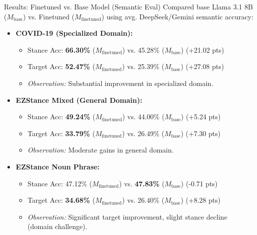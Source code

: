 \documentclass{beamer}
\begin{document}
\begin{frame}{Results: Finetuned vs. Base Model (Semantic Eval)}
  \footnotesize %
  Compared base Llama 3.1 8B ($M_{\text{base}}$) vs. Finetuned ($M_{\text{finetuned}}$) using avg. DeepSeek/Gemini semantic accuracy:

  \medskip
  \begin{itemize}
    \item \textbf{COVID-19 (Specialized Domain):}
          \begin{itemize}
            \item Stance Acc: \textbf{66.30\%} ($M_{\text{finetuned}}$) vs. 45.28\% ($M_{\text{base}}$) \quad (+21.02 pts)
            \item Target Acc: \textbf{52.47\%} ($M_{\text{finetuned}}$) vs. 25.39\% ($M_{\text{base}}$) \quad (+27.08 pts)
            \item \textit{Observation:} Substantial improvement in specialized domain.
          \end{itemize}
    \medskip
    \item \textbf{EZStance Mixed (General Domain):}
          \begin{itemize}
            \item Stance Acc: \textbf{49.24\%} ($M_{\text{finetuned}}$) vs. 44.00\% ($M_{\text{base}}$) \quad (+5.24 pts)
            \item Target Acc: \textbf{33.79\%} ($M_{\text{finetuned}}$) vs. 26.49\% ($M_{\text{base}}$) \quad (+7.30 pts)
            \item \textit{Observation:} Moderate gains in general domain.
          \end{itemize}
    \medskip
    \item \textbf{EZStance Noun Phrase:}
          \begin{itemize}
            \item Stance Acc: 47.12\% ($M_{\text{finetuned}}$) vs. \textbf{47.83\%} ($M_{\text{base}}$) \quad (-0.71 pts)
            \item Target Acc: \textbf{34.68\%} ($M_{\text{finetuned}}$) vs. 26.40\% ($M_{\text{base}}$) \quad (+8.28 pts)
            \item \textit{Observation:} Significant target improvement, slight stance decline (domain challenge).
          \end{itemize}
  \end{itemize}
\end{frame}
\end{document}
